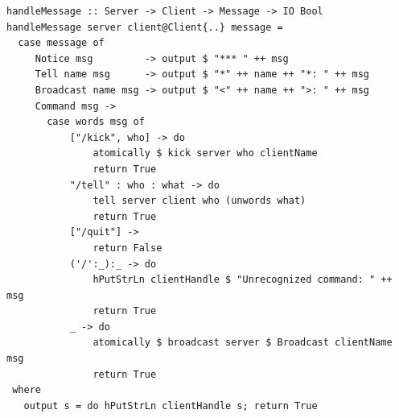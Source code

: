 \documentclass{beamer}
\begin{document}
\begin{frame}[fragile]

\begin{verbatim}
handleMessage :: Server -> Client -> Message -> IO Bool
handleMessage server client@Client{..} message =
  case message of
     Notice msg         -> output $ "*** " ++ msg
     Tell name msg      -> output $ "*" ++ name ++ "*: " ++ msg
     Broadcast name msg -> output $ "<" ++ name ++ ">: " ++ msg
     Command msg ->
       case words msg of
           ["/kick", who] -> do
               atomically $ kick server who clientName
               return True
           "/tell" : who : what -> do
               tell server client who (unwords what)
               return True
           ["/quit"] ->
               return False
           ('/':_):_ -> do
               hPutStrLn clientHandle $ "Unrecognized command: " ++ msg
               return True
           _ -> do
               atomically $ broadcast server $ Broadcast clientName msg
               return True
 where
   output s = do hPutStrLn clientHandle s; return True
\end{verbatim}

\end{frame}
\end{document}
